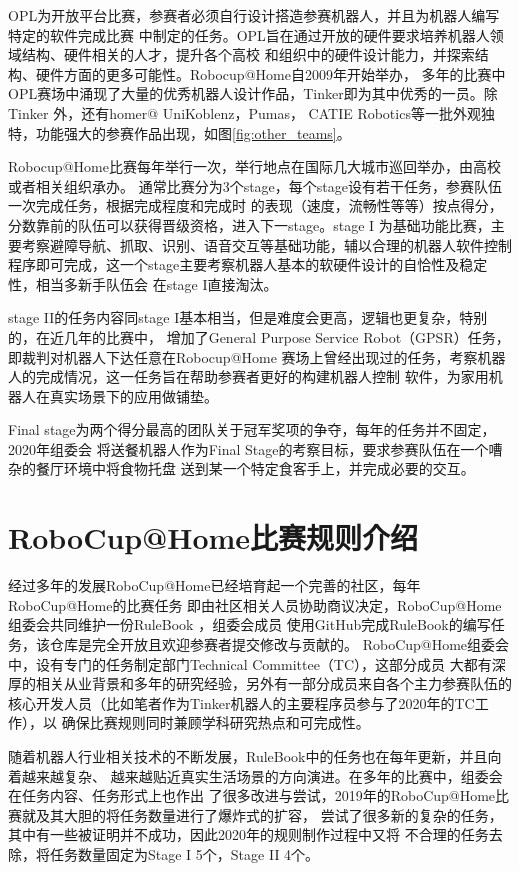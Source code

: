 OPL为开放平台比赛，参赛者必须自行设计搭造参赛机器人，并且为机器人编写特定的软件完成比赛
中制定的任务。OPL旨在通过开放的硬件要求培养机器人领域结构、硬件相关的人才，提升各个高校
和组织中的硬件设计能力，并探索结构、硬件方面的更多可能性。Robocup@Home自2009年开始举办，
多年的比赛中OPL赛场中涌现了大量的优秀机器人设计作品，Tinker即为其中优秀的一员。除Tinker
外，还有homer@ UniKoblenz\cite{memmesheimer2017homer}，Pumas\cite{savage2013pumas}，
CATIE Robotics\cite{fabre2018catie}等一批外观独特，功能强大的参赛作品出现，如图\ref{fig:other_teams}。

Robocup@Home比赛每年举行一次，举行地点在国际几大城市巡回举办，由高校或者相关组织承办。
通常比赛分为3个stage，每个stage设有若干任务，参赛队伍一次完成任务，根据完成程度和完成时
的表现（速度，流畅性等等）按点得分，分数靠前的队伍可以获得晋级资格，进入下一stage。stage I
为基础功能比赛，主要考察避障导航、抓取、识别、语音交互等基础功能，辅以合理的机器人软件控制
程序即可完成，这一个stage主要考察机器人基本的软硬件设计的自恰性及稳定性，相当多新手队伍会
在stage I直接淘汰。

stage II的任务内容同stage I基本相当，但是难度会更高，逻辑也更复杂，特别的，在近几年的比赛中，
增加了General Purpose Service Robot（GPSR）任务，即裁判对机器人下达任意在Robocup@Home
赛场上曾经出现过的任务，考察机器人的完成情况，这一任务旨在帮助参赛者更好的构建机器人控制
软件，为家用机器人在真实场景下的应用做铺垫。

Final stage为两个得分最高的团队关于冠军奖项的争夺，每年的任务并不固定，2020年组委会
将送餐机器人作为Final Stage的考察目标，要求参赛队伍在一个嘈杂的餐厅环境中将食物托盘
送到某一个特定食客手上，并完成必要的交互。


\section{RoboCup@Home比赛规则介绍}

经过多年的发展RoboCup@Home已经培育起一个完善的社区，每年RoboCup@Home的比赛任务
即由社区相关人员协助商议决定，RoboCup@Home组委会共同维护一份RuleBook\cite{rulebook}
，组委会成员
使用GitHub完成RuleBook的编写任务，该仓库是完全开放且欢迎参赛者提交修改与贡献的。
RoboCup@Home组委会中，设有专门的任务制定部门Technical Committee（TC），这部分成员
大都有深厚的相关从业背景和多年的研究经验，另外有一部分成员来自各个主力参赛队伍的
核心开发人员（比如笔者作为Tinker机器人的主要程序员参与了2020年的TC工作），以
确保比赛规则同时兼顾学科研究热点和可完成性。

随着机器人行业相关技术的不断发展，RuleBook中的任务也在每年更新，并且向着越来越复杂、
越来越贴近真实生活场景的方向演进。在多年的比赛中，组委会在任务内容、任务形式上也作出
了很多改进与尝试，2019年的RoboCup@Home比赛就及其大胆的将任务数量进行了爆炸式的扩容，
尝试了很多新的复杂的任务，其中有一些被证明并不成功，因此2020年的规则制作过程中又将
不合理的任务去除，将任务数量固定为Stage I 5个，Stage II 4个。

